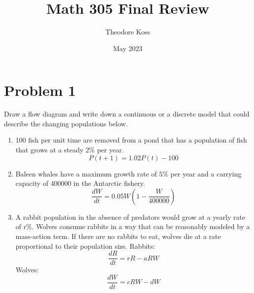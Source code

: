 \documentclass{article}
\title{Math 305 Final Review}
\author{Theodore Koss}
\date{May 2023}
\begin{document}
\maketitle
\section*{Problem 1}Draw a flow diagram and write down a continuous or a discrete model that could describe the changing populations below.
\begin{enumerate}[label=(\alph*)]
    \item 100 fish per unit time are removed from a pond that has a population of fish that grows at a steady $2 \%$ per year.$$P(t+1)=1.02P(t)-100$$
    \item Baleen whales have a maximum growth rate of $5 \%$ per year and a carrying capacity of 400000 in the Antarctic fishery.$$\frac{dW}{dt}=0.05W(1-\frac{W}{400000})$$
    \item A rabbit population in the absence of predators would grow at a yearly rate of $\mathrm{r} \%$. Wolves consume rabbits in a way that can be reasonably modeled by a mass-action term. If there are no rabbits to eat, wolves die at a rate proportional to their population size. Rabbits:$$\frac{dR}{dt}=rR-aRW$$ Wolves: $$\frac{dW}{dt}=cRW-dW$$
\end{enumerate}
\end{document}
